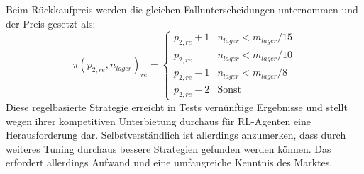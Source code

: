 Beim Rückkaufpreis werden die gleichen Fallunterscheidungen unternommen und der Preis gesetzt als:
\begin{equation}
	\pi(p_{2, re}, n_{lager})_{re} =
	\begin{cases}
		p_{2, re} + 1 & n_{lager} < m_{lager} / 15\\
		p_{2, re} & n_{lager} < m_{lager} / 10\\
		p_{2, re} - 1 & n_{lager} < m_{lager} / 8\\
		p_{2, re} - 2 & \text{Sonst}
	\end{cases}
\end{equation}
Diese regelbasierte Strategie erreicht in Tests vernünftige Ergebnisse und stellt wegen ihrer kompetitiven Unterbietung durchaus für RL-Agenten eine Herausforderung dar.
Selbstverständlich ist allerdings anzumerken, dass durch weiteres Tuning durchaus bessere Strategien gefunden werden können.
Das erfordert allerdings Aufwand und eine umfangreiche Kenntnis des Marktes.